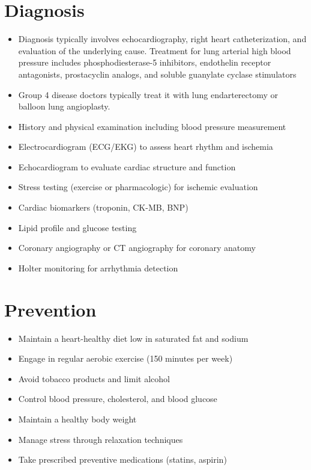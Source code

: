 \section{Diagnosis}
\begin{itemize}[noitemsep]
  \item Diagnosis typically involves echocardiography, right heart catheterization, and evaluation of the underlying cause. Treatment for lung arterial high blood pressure includes phosphodiesterase-5 inhibitors, endothelin receptor antagonists, prostacyclin analogs, and soluble guanylate cyclase stimulators
  \item Group 4 disease doctors typically treat it with lung endarterectomy or balloon lung angioplasty.
  \item History and physical examination including blood pressure measurement
  \item Electrocardiogram (ECG/EKG) to assess heart rhythm and ischemia
  \item Echocardiogram to evaluate cardiac structure and function
  \item Stress testing (exercise or pharmacologic) for ischemic evaluation
  \item Cardiac biomarkers (troponin, CK-MB, BNP)
  \item Lipid profile and glucose testing
  \item Coronary angiography or CT angiography for coronary anatomy
  \item Holter monitoring for arrhythmia detection
\end{itemize}
\section{Prevention}
\begin{itemize}[noitemsep]
  \item Maintain a heart-healthy diet low in saturated fat and sodium
  \item Engage in regular aerobic exercise (150 minutes per week)
  \item Avoid tobacco products and limit alcohol
  \item Control blood pressure, cholesterol, and blood glucose
  \item Maintain a healthy body weight
  \item Manage stress through relaxation techniques
  \item Take prescribed preventive medications (statins, aspirin)
\end{itemize}
